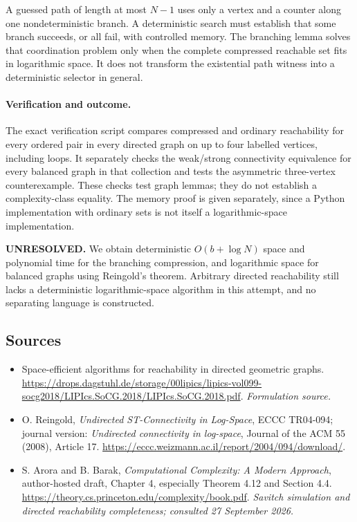 \documentclass[11pt]{article}
\begin{document}
A guessed path of length at most $N-1$ uses only a vertex and a counter along one nondeterministic branch. A deterministic search must establish that some branch succeeds, or all fail, with controlled memory. The branching lemma solves that coordination problem only when the complete compressed reachable set fits in logarithmic space. It does not transform the existential path witness into a deterministic selector in general.

\paragraph{Verification and outcome.}
The exact verification script compares compressed and ordinary reachability for every ordered pair in every directed graph on up to four labelled vertices, including loops. It separately checks the weak/strong connectivity equivalence for every balanced graph in that collection and tests the asymmetric three-vertex counterexample. These checks test graph lemmas; they do not establish a complexity-class equality. The memory proof is given separately, since a Python implementation with ordinary sets is not itself a logarithmic-space implementation.

\textbf{UNRESOLVED.} We obtain deterministic $O(b+\log N)$ space and polynomial time for the branching compression, and logarithmic space for balanced graphs using Reingold's theorem. Arbitrary directed reachability still lacks a deterministic logarithmic-space algorithm in this attempt, and no separating language is constructed.

\subsection{Sources}
\begin{itemize}
\item[S1]Space-efficient algorithms for reachability in directed geometric graphs.
\url{https://drops.dagstuhl.de/storage/00lipics/lipics-vol099-socg2018/LIPIcs.SoCG.2018/LIPIcs.SoCG.2018.pdf}.
\textit{Formulation source.}
\item[E1]O. Reingold, \emph{Undirected ST-Connectivity in Log-Space}, ECCC TR04-094; journal version: \emph{Undirected connectivity in log-space}, Journal of the ACM 55 (2008), Article 17.
\url{https://eccc.weizmann.ac.il/report/2004/094/download/}.
\item[E2]S. Arora and B. Barak, \emph{Computational Complexity: A Modern Approach}, author-hosted draft, Chapter 4, especially Theorem 4.12 and Section 4.4.
\url{https://theory.cs.princeton.edu/complexity/book.pdf}.
\textit{Savitch simulation and directed reachability completeness; consulted 27 September 2026.}
\end{itemize}
\end{document}
